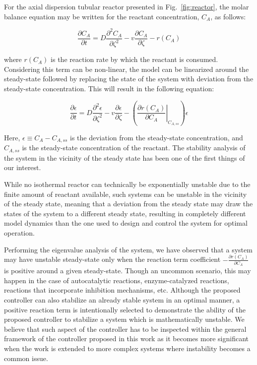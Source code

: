\documentclass[11pt,answers]{exam}
\begin{document}
\begin{questions}
\begin{solutionorbox}
        For the axial dispersion tubular reactor presented in Fig.~\ref{fig:reactor}, the molar balance equation may be written for the reactant concentration, $C_A$, as follows:
        
        \begin{equation}
            \frac{\partial C_A}{\partial t} = D \frac{\partial^2 C_A}{\partial \zeta^2} - v \frac{\partial C_A}{\partial \zeta} - r(C_A)
        \end{equation}
        
        where $r(C_A)$ is the reaction rate by which the reactant is consumed. Considering this term can be non-linear, the model can be linearized around the steady-state followed by replacing the state of the system with deviation from the steady-state concentration. This will result in the following equation:
        
        \begin{equation}
            \frac{\partial \epsilon}{\partial t} = D \frac{\partial^2 \epsilon}{\partial \zeta^2} - v \frac{\partial \epsilon}{\partial \zeta} - \left( \left. \frac{\partial r(C_A)}{\partial C_A} \right|_{C_{A, ss}} \right) \epsilon
        \end{equation}
        
        Here, $\epsilon \equiv C_A - C_{A, ss}$ is the deviation from the steady-state concentration, and $C_{A, ss}$ is the steady-state concentration of the reactant. The stability analysis of the system in the vicinity of the steady state has been one of the first things of our interest. 
        
        While no isothermal reactor can technically be exponentially unstable due to the finite amount of reactant available, such systems can be unstable in the vicinity of the steady state, meaning that a deviation from the steady state may draw the states of the system to a different steady state, resulting in completely different model dynamics than the one used to design and control the system for optimal operation.
        
        Performing the eigenvalue analysis of the system, we have observed that a system may have unstable steady-state only when the reaction term coefficient $-\frac{\partial r(C_A)}{\partial C_A}$ is positive around a given steady-state. Though an uncommon scenario, this may happen in the case of autocatalytic reactions, enzyme-catalyzed reactions, reactions that incorporate inhibition mechanisms, etc. Although the proposed controller can also stabilize an already stable system in an optimal manner, a positive reaction term is intentionally selected to demonstrate the ability of the proposed controller to stabilize a system which is mathematically unstable. We believe that such aspect of the controller has to be inspected within the general framework of the controller proposed in this work as it becomes more significant when the work is extended to more complex systems where instability becomes a common issue.


\end{solutionorbox}
\end{questions}
\end{document}
